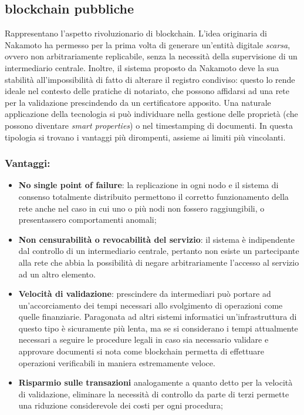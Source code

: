 	\subsection{blockchain pubbliche}
		Rappresentano l'aspetto rivoluzionario di blockchain. L'idea originaria di Nakamoto ha permesso per la prima volta di generare un'entità digitale \emph{scarsa}, ovvero non arbitrariamente replicabile, senza la necessità della supervisione di un intermediario centrale. Inoltre, il sistema proposto da Nakamoto deve la sua stabilità all'impossibilità di fatto di alterare il registro condiviso: questo lo rende ideale nel contesto delle pratiche di notariato, che possono affidarsi ad una rete per la validazione prescindendo da un certificatore apposito. Una naturale applicazione della tecnologia si può individuare nella gestione delle proprietà (che possono diventare \emph{smart properties}) o nel timestamping di documenti. In questa tipologia si trovano i vantaggi più dirompenti, assieme ai limiti più vincolanti.
		\subsubsection{Vantaggi:}
			\begin{itemize}
				\item \textbf{No single point of failure}: la replicazione in ogni nodo e il sistema di consenso totalmente distribuito permettono il corretto funzionamento della rete anche nel caso in cui uno o più nodi non fossero raggiungibili, o presentassero comportamenti anomali;
				\item \textbf{Non censurabilità o revocabilità del servizio}: il sistema è indipendente dal controllo di un intermediario centrale, pertanto non esiste un partecipante alla rete che abbia la possibilità di negare arbitrariamente l'accesso al servizio ad un altro elemento.
				\item \textbf{Velocità di validazione}: prescindere da intermediari può portare ad un'accorciamento dei tempi necessari allo svolgimento di operazioni come quelle finanziarie. Paragonata ad altri sistemi informatici un'infrastruttura di questo tipo è sicuramente più lenta, ma se si considerano i tempi attualmente necessari a seguire le procedure legali in caso sia necessario validare e approvare documenti si nota come blockchain permetta di effettuare operazioni verificabili in maniera estremamente veloce.
				\item \textbf{Risparmio sulle transazioni} analogamente a quanto detto per la velocità di validazione, eliminare la necessità di controllo da parte di terzi permette una riduzione considerevole dei costi per ogni procedura;
			\end{itemize}
